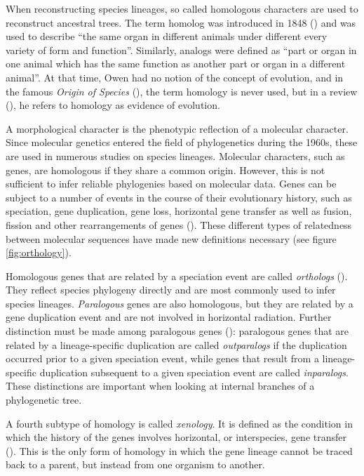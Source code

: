 When reconstructing species lineages, so called homologous characters are used
to reconstruct ancestral trees. The term homolog was introduced in 1848
(\cite{owen1848}) and was used to describe ``the same organ in different animals
under different every variety of form and function''. Similarly, analogs were
defined as ``part or organ in one animal which has the same function as another
part or organ in a different animal''. At that time, Owen had no notion of the
concept of evolution, and in the famous \emph{Origin of Species}
(\cite{darwin1859}), the term homology is never used, but in a review
(\cite{owen1860}), he refers to homology as evidence of evolution.

A morphological character is the phenotypic reflection of a molecular character.
Since molecular genetics entered the field of phylogenetics during the 1960s,
these are used in numerous studies on species lineages.  Molecular characters,
such as genes, are homologous if they share a common origin. However, this is
not sufficient to infer reliable phylogenies based on molecular data. Genes can
be subject to a number of events in the course of their evolutionary history,
such as speciation, gene duplication, gene loss, horizontal gene transfer as
well as fusion, fission and other rearrangements of genes (\cite{koonin2005}).
These different types of relatedness between molecular sequences have made new
definitions necessary (see figure \ref{fig:orthology}).



Homologous genes that are related by a speciation event are called
\emph{orthologs} (\cite{fitch1970}). They reflect species phylogeny directly and
are most commonly used to infer species lineages. \emph{Paralogous} genes are
also homologous, but they are related by a gene duplication event and are not
involved in horizontal radiation. Further distinction must be made among
paralogous genes (\cite{sonnhammer2002}): paralogous genes that are related by a
lineage-specific duplication are called \emph{outparalogs} if the duplication
occurred prior to a given speciation event, while genes that result from a
lineage-specific duplication subsequent to a given speciation event are called
\emph{inparalogs}.  These distinctions are important when looking at internal
branches of a phylogenetic tree.

A fourth subtype of homology is called \emph{xenology}. It is defined as the
condition in which the history of the genes involves horizontal, or
interspecies, gene transfer (\cite{gray1983}). This is the only form of homology
in which the gene lineage cannot be traced back to a parent, but instead from
one organism to another.


